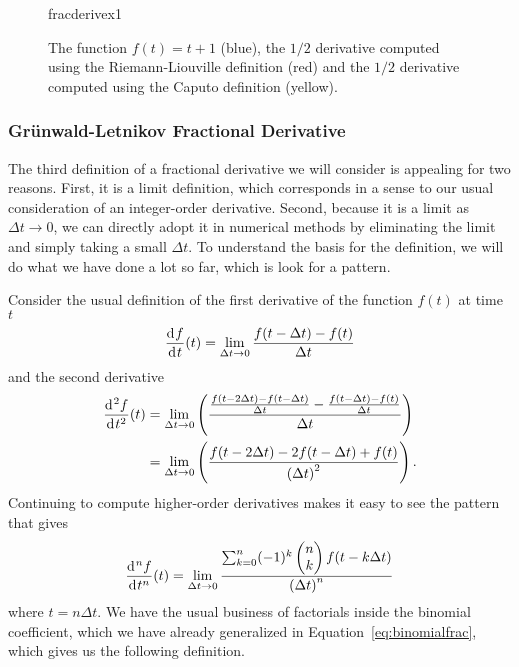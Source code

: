     \begin{figure}
      \centering
      {fracderivex1}
      \caption{The function $f(t) = t + 1$ (blue), the $1/2$ derivative computed using the Riemann-Liouville definition (red) and the $1/2$ derivative computed using the Caputo definition (yellow).}
      \label{fig:fracderivex1}
    \end{figure}

    \subsubsection{Gr\"unwald-Letnikov Fractional Derivative}
    The third definition of a fractional derivative we will consider is appealing for two reasons. First, it is a limit definition, which corresponds in a sense to our usual consideration of an integer-order derivative. Second, because it is a limit as $\Delta t \rightarrow 0$, we can directly adopt it in numerical methods by eliminating the limit and simply taking a small $\Delta t$. To understand the basis for the definition, we will do what we have done a lot so far, which is look for a pattern.

    Consider the usual definition of the first derivative of the function $f(t)$ at time $t$
    \begin{equation*}
      \frac{\operatorname{d}\hspace*{-1pt} f}{\operatorname{d}\hspace*{-1pt} t}(t) = \lim_{\Delta t \rightarrow 0} \frac{f(t - \Delta t) - f(t)}{\Delta t} 
    \end{equation*}
    and the second derivative
    \begin{align*}
      \frac{\operatorname{d}\hspace*{-1pt}^2 f}{\operatorname{d}\hspace*{-1pt} t^2}(t) &= \lim_{\Delta t \rightarrow 0} \left( \frac{ \frac{f(t - 2 \Delta t) - f(t - \Delta t)}{\Delta t}  - \frac{f(t - \Delta t) - f(t)}{\Delta t}  }{\Delta t} \right) \\
      &= \lim_{\Delta t \rightarrow 0} \left( \frac{f(t - 2 \Delta t) - 2 f(t - \Delta t) + f(t)}{\left( \Delta t \right)^2} \right).
    \end{align*}
    Continuing to compute higher-order derivatives makes it easy to see the pattern that gives
    \begin{equation*}
      \frac{\operatorname{d}\hspace*{-1pt}^n f}{\operatorname{d}\hspace*{-1pt} t^n}(t) = \lim_{\Delta t \rightarrow 0} \frac{ \sum_{k=0}^n (-1)^k \begin{pmatrix} n \\ k \end{pmatrix} f(t - k \Delta t) }{\left( \Delta t \right)^n}
    \end{equation*}
    where $t = n \Delta t$. We have the usual business of factorials inside the binomial coefficient, which we have already generalized in Equation~\ref{eq:binomialfrac}, which gives us the following definition.

